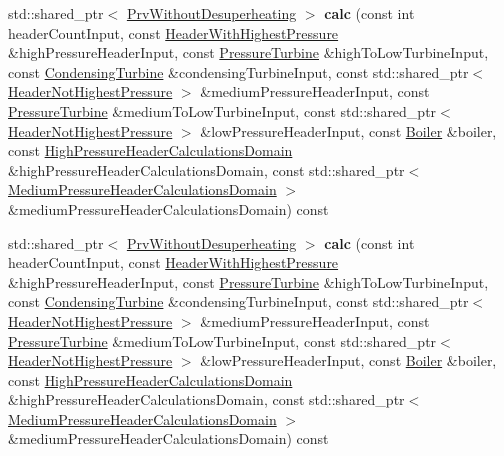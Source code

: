 \begin{DoxyCompactItemize}
std\+::shared\+\_\+ptr$<$ \hyperlink{class_prv_without_desuperheating}{Prv\+Without\+Desuperheating} $>$ {\bfseries calc} (const int header\+Count\+Input, const \hyperlink{class_header_with_highest_pressure}{Header\+With\+Highest\+Pressure} \&high\+Pressure\+Header\+Input, const \hyperlink{class_pressure_turbine}{Pressure\+Turbine} \&high\+To\+Low\+Turbine\+Input, const \hyperlink{class_condensing_turbine}{Condensing\+Turbine} \&condensing\+Turbine\+Input, const std\+::shared\+\_\+ptr$<$ \hyperlink{class_header_not_highest_pressure}{Header\+Not\+Highest\+Pressure} $>$ \&medium\+Pressure\+Header\+Input, const \hyperlink{class_pressure_turbine}{Pressure\+Turbine} \&medium\+To\+Low\+Turbine\+Input, const std\+::shared\+\_\+ptr$<$ \hyperlink{class_header_not_highest_pressure}{Header\+Not\+Highest\+Pressure} $>$ \&low\+Pressure\+Header\+Input, const \hyperlink{class_boiler}{Boiler} \&boiler, const \hyperlink{class_high_pressure_header_calculations_domain}{High\+Pressure\+Header\+Calculations\+Domain} \&high\+Pressure\+Header\+Calculations\+Domain, const std\+::shared\+\_\+ptr$<$ \hyperlink{class_medium_pressure_header_calculations_domain}{Medium\+Pressure\+Header\+Calculations\+Domain} $>$ \&medium\+Pressure\+Header\+Calculations\+Domain) const
\item 
\mbox{\label{class_low_pressure_prv_calculator_ae120bafe2b52acee5aafc40b928e2b1b}} 
std\+::shared\+\_\+ptr$<$ \hyperlink{class_prv_without_desuperheating}{Prv\+Without\+Desuperheating} $>$ {\bfseries calc} (const int header\+Count\+Input, const \hyperlink{class_header_with_highest_pressure}{Header\+With\+Highest\+Pressure} \&high\+Pressure\+Header\+Input, const \hyperlink{class_pressure_turbine}{Pressure\+Turbine} \&high\+To\+Low\+Turbine\+Input, const \hyperlink{class_condensing_turbine}{Condensing\+Turbine} \&condensing\+Turbine\+Input, const std\+::shared\+\_\+ptr$<$ \hyperlink{class_header_not_highest_pressure}{Header\+Not\+Highest\+Pressure} $>$ \&medium\+Pressure\+Header\+Input, const \hyperlink{class_pressure_turbine}{Pressure\+Turbine} \&medium\+To\+Low\+Turbine\+Input, const std\+::shared\+\_\+ptr$<$ \hyperlink{class_header_not_highest_pressure}{Header\+Not\+Highest\+Pressure} $>$ \&low\+Pressure\+Header\+Input, const \hyperlink{class_boiler}{Boiler} \&boiler, const \hyperlink{class_high_pressure_header_calculations_domain}{High\+Pressure\+Header\+Calculations\+Domain} \&high\+Pressure\+Header\+Calculations\+Domain, const std\+::shared\+\_\+ptr$<$ \hyperlink{class_medium_pressure_header_calculations_domain}{Medium\+Pressure\+Header\+Calculations\+Domain} $>$ \&medium\+Pressure\+Header\+Calculations\+Domain) const
\end{DoxyCompactItemize}


